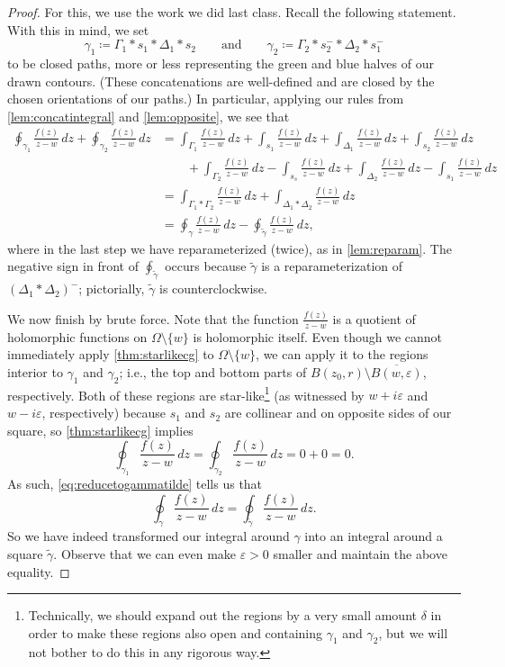 \begin{proof}
	For this, we use the work we did last class. Recall the following statement.
	\starlikecg*
	\noindent With this in mind, we set
	\[\gamma_1\coloneqq \Gamma_1*s_1*\Delta_1*s_2\qquad\text{and}\qquad\gamma_2\coloneqq \Gamma_2*s_2^-*\Delta_2*s_1^-\]
	to be closed paths, more or less representing the green and blue halves of our drawn contours. (These concatenations are well-defined and are closed by the chosen orientations of our paths.) In particular, applying our rules from \autoref{lem:concatintegral} and \autoref{lem:opposite}, we see that
	\begin{align*}
		\oint_{\gamma_1}\frac{f(z)}{z-w}\,dz+\oint_{\gamma_2}\frac{f(z)}{z-w}\,dz &= \int_{\Gamma_1}\frac{f(z)}{z-w}\,dz+\int_{s_1}\frac{f(z)}{z-w}\,dz+\int_{\Delta_1}\frac{f(z)}{z-w}\,dz+\int_{s_2}\frac{f(z)}{z-w}\,dz \\
		&\qquad +\int_{\Gamma_2}\frac{f(z)}{z-w}\,dz-\int_{s_s}\frac{f(z)}{z-w}\,dz+\int_{\Delta_2}\frac{f(z)}{z-w}\,dz-\int_{s_1}\frac{f(z)}{z-w}\,dz \\
		&= \int_{\Gamma_1*\Gamma_2}\frac{f(z)}{z-w}\,dz+\int_{\Delta_1*\Delta_2}\frac{f(z)}{z-w}\,dz \\
		&= \oint_{\gamma}\frac{f(z)}{z-w}\,dz-\oint_{\widetilde\gamma}\frac{f(z)}{z-w}\,dz, \tag{1}\label{eq:reducetogammatilde}
	\end{align*}
	where in the last step we have reparameterized (twice), as in \autoref{lem:reparam}. The negative sign in front of $\oint_{\widetilde\gamma}$ occurs because $\widetilde\gamma$ is a reparameterization of $(\Delta_1*\Delta_2)^-$; pictorially, $\widetilde\gamma$ is counterclockwise.

	We now finish by brute force. Note that the function $\frac{f(z)}{z-w}$ is a quotient of holomorphic functions on $\Omega\setminus\{w\}$ is holomorphic itself. Even though we cannot immediately apply \autoref{thm:starlikecg} to $\Omega\setminus\{w\}$, we can apply it to the regions interior to $\gamma_1$ and $\gamma_2$; i.e., the top and bottom parts of $B(z_0,r)\setminus\overline{B(w,\varepsilon)}$, respectively. Both of these regions are star-like\footnote{Technically, we should expand out the regions by a very small amount $\delta$ in order to make these regions also open and containing $\gamma_1$ and $\gamma_2$, but we will not bother to do this in any rigorous way.} (as witnessed by $w+i\varepsilon$ and $w-i\varepsilon$, respectively) because $s_1$ and $s_2$ are collinear and on opposite sides of our square, so \autoref{thm:starlikecg} implies
	\[\oint_{\gamma_1}\frac{f(z)}{z-w}\,dz=\oint_{\gamma_2}\frac{f(z)}{z-w}\,dz=0+0=0.\]
	As such, \autoref{eq:reducetogammatilde} tells us that
	\[\oint_\gamma\frac{f(z)}{z-w}\,dz=\oint_{\widetilde\gamma}\frac{f(z)}{z-w}\,dz.\]
	So we have indeed transformed our integral around $\gamma$ into an integral around a square $\widetilde\gamma$. Observe that we can even make $\varepsilon>0$ smaller and maintain the above equality.


\end{proof}

